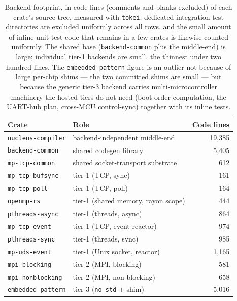 \begin{table}[t]
  \centering
  \small
  \begin{tabular}{@{}llr@{}}
    \toprule
    Crate & Role & Code lines \\
    \midrule
    \texttt{nucleus-compiler} & backend-independent middle-end & 19{,}385 \\
    \texttt{backend-common}   & shared codegen library         & 5{,}405 \\
    \texttt{mp-tcp-common}    & shared socket-transport substrate & 612 \\
    \midrule
    \texttt{mp-tcp-bufsync}   & tier-1 (TCP, sync)             & 161 \\
    \texttt{mp-tcp-poll}      & tier-1 (TCP, poll)             & 164 \\
    \texttt{openmp-rs}        & tier-1 (shared memory, rayon scope) & 444 \\
    \texttt{pthreads-async}   & tier-1 (threads, async)        & 864 \\
    \texttt{mp-tcp-event}     & tier-1 (TCP, event reactor)    & 974 \\
    \texttt{pthreads-sync}    & tier-1 (threads, sync)         & 985 \\
    \texttt{mp-uds-event}     & tier-1 (Unix socket, reactor)  & 1{,}165 \\
    \midrule
    \texttt{mpi-blocking}     & tier-2 (MPI, blocking)         & 581 \\
    \texttt{mpi-nonblocking}  & tier-2 (MPI, non-blocking)     & 658 \\
    \texttt{embedded-pattern} & tier-3 (\texttt{no\_std} + shim) & 5{,}016 \\
    \bottomrule
  \end{tabular}
  \caption{Backend footprint, in code lines (comments and blanks excluded) of each
  crate's source tree, measured with \texttt{tokei}; dedicated integration-test
  directories are excluded uniformly across all rows, and the small amount of inline
  unit-test code that remains in a few crates is likewise counted uniformly. The
  shared base (\texttt{backend-common} plus the middle-end) is large;
  individual tier-1 backends are small, the thinnest under two hundred lines. The
  \texttt{embedded-pattern} figure is an outlier not because of large per-chip
  shims --- the two committed shims are small --- but because the generic tier-3
  backend carries multi-microcontroller machinery the hosted tiers do not need
  (boot-order computation, the UART-hub plan, cross-MCU control-sync) together with
  its inline tests.}
  \label{tab:quant-footprint}
\end{table}

